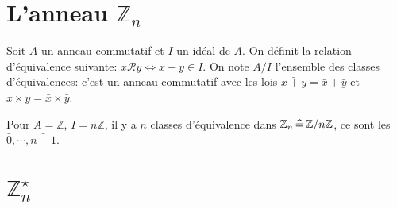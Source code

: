 
\section{L'anneau $\mathbb Z_n$}

Soit $A$ un anneau commutatif et $I$ un idéal de $A$. On définit la relation d'équivalence suivante: $x\mathcal Ry\iff x-y\in I$. On note $A/I$ l'ensemble des classes d'équivalences: c'est un anneau commutatif avec les lois $\bar{x+y}=\bar x+\bar y$ et $\bar{x\times y}=\bar x\times \bar y$.

Pour $A=\mathbb Z$, $I=n\mathbb Z$, il y a $n$ classes d'équivalence dans $\mathbb Z_n\,\widehat=\,\mathbb Z/n\mathbb Z$, ce sont les $\bar 0, \cdots , \bar{n-1}$.

\section{$\mathbb Z_n^\star$}
